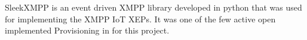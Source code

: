 SleekXMPP is an event driven XMPP library developed in python that was used for
implementing the XMPP IoT XEPs. It was one of the few active open implemented
Provisioning in for this project. 
